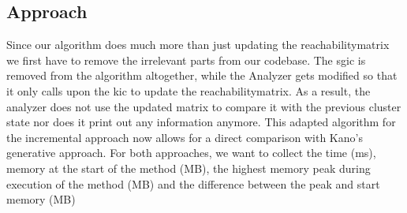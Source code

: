\subsection{Approach} \label{exp1:approach}
Since our algorithm does much more than just updating the reachabilitymatrix we first have to remove the irrelevant parts from our codebase. The \acrlong{sgic} is removed from the algorithm altogether, while the Analyzer gets modified so that it only calls upon the \acrlong{kic} to update the reachabilitymatrix. As a result, the analyzer does not use the updated matrix to compare it with the previous cluster state nor does it print out any information anymore. This adapted algorithm for the incremental approach now allows for a direct comparison with Kano's generative approach.  For both approaches, we want to collect the time (ms), memory at the start of the method (MB), the highest memory peak during execution of the method (MB) and  the difference between the peak and start memory (MB)
\\[10pt]

